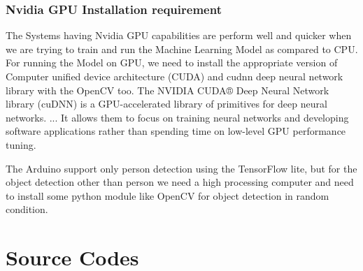 \subsection{Nvidia GPU Installation requirement}
The Systems having Nvidia GPU capabilities are perform well and quicker when we are trying to train and run the Machine Learning Model as compared to CPU. For running the Model on GPU, we need to install the appropriate version of Computer unified device architecture (CUDA) and cudnn deep neural network library with the OpenCV too. The NVIDIA CUDA® Deep Neural Network library (cuDNN) is a GPU-accelerated library of primitives for deep neural networks. ... It allows them to focus on training neural networks and developing software applications rather than spending time on low-level GPU performance tuning. 

The Arduino support only person detection using the TensorFlow lite, but for the object detection other than person we need a high processing computer and need to install some python module like OpenCV for object detection in random condition.



\chapter{Source Codes}

